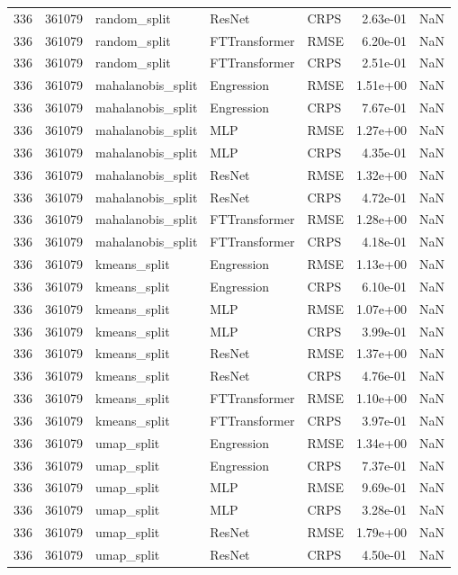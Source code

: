 \begin{tabular}{rrlllrr}
336 & 361079 & random\_split & ResNet & CRPS & 2.63e-01 & NaN \\
336 & 361079 & random\_split & FTTransformer & RMSE & 6.20e-01 & NaN \\
336 & 361079 & random\_split & FTTransformer & CRPS & 2.51e-01 & NaN \\
336 & 361079 & mahalanobis\_split & Engression & RMSE & 1.51e+00 & NaN \\
336 & 361079 & mahalanobis\_split & Engression & CRPS & 7.67e-01 & NaN \\
336 & 361079 & mahalanobis\_split & MLP & RMSE & 1.27e+00 & NaN \\
336 & 361079 & mahalanobis\_split & MLP & CRPS & 4.35e-01 & NaN \\
336 & 361079 & mahalanobis\_split & ResNet & RMSE & 1.32e+00 & NaN \\
336 & 361079 & mahalanobis\_split & ResNet & CRPS & 4.72e-01 & NaN \\
336 & 361079 & mahalanobis\_split & FTTransformer & RMSE & 1.28e+00 & NaN \\
336 & 361079 & mahalanobis\_split & FTTransformer & CRPS & 4.18e-01 & NaN \\
336 & 361079 & kmeans\_split & Engression & RMSE & 1.13e+00 & NaN \\
336 & 361079 & kmeans\_split & Engression & CRPS & 6.10e-01 & NaN \\
336 & 361079 & kmeans\_split & MLP & RMSE & 1.07e+00 & NaN \\
336 & 361079 & kmeans\_split & MLP & CRPS & 3.99e-01 & NaN \\
336 & 361079 & kmeans\_split & ResNet & RMSE & 1.37e+00 & NaN \\
336 & 361079 & kmeans\_split & ResNet & CRPS & 4.76e-01 & NaN \\
336 & 361079 & kmeans\_split & FTTransformer & RMSE & 1.10e+00 & NaN \\
336 & 361079 & kmeans\_split & FTTransformer & CRPS & 3.97e-01 & NaN \\
336 & 361079 & umap\_split & Engression & RMSE & 1.34e+00 & NaN \\
336 & 361079 & umap\_split & Engression & CRPS & 7.37e-01 & NaN \\
336 & 361079 & umap\_split & MLP & RMSE & 9.69e-01 & NaN \\
336 & 361079 & umap\_split & MLP & CRPS & 3.28e-01 & NaN \\
336 & 361079 & umap\_split & ResNet & RMSE & 1.79e+00 & NaN \\
336 & 361079 & umap\_split & ResNet & CRPS & 4.50e-01 & NaN \\

\end{tabular}
